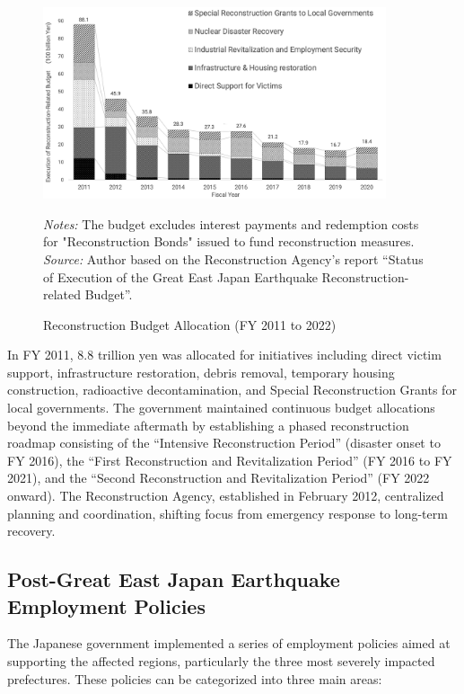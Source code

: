 \documentclass[a4paper,12pt]{article}
\begin{document}
\begin{figure}[htbp]
    \centering
    \includegraphics[width=0.9\textwidth]{Reconstruction-Related Budget.jpeg}
    \footnotesize
    \begin{minipage}{0.9\textwidth}
        \textit{Notes:} The budget excludes interest payments and redemption costs for "Reconstruction Bonds" issued to fund reconstruction measures.\\
        \textit{Source:} Author based on the Reconstruction Agency's report ``Status of Execution of the Great East Japan Earthquake Reconstruction-related Budget''.
    \end{minipage}
    \caption{Reconstruction Budget Allocation (FY 2011 to 2022)}
    \label{fig:Budget}
\end{figure}

In FY 2011, 8.8 trillion yen was allocated for initiatives including direct victim support, infrastructure restoration, debris removal, temporary housing construction, radioactive decontamination, and Special Reconstruction Grants for local governments. The government maintained continuous budget allocations beyond the immediate aftermath by establishing a phased reconstruction roadmap consisting of the ``Intensive Reconstruction Period'' (disaster onset to FY 2016), the ``First Reconstruction and Revitalization Period'' (FY 2016 to FY 2021), and the ``Second Reconstruction and Revitalization Period'' (FY 2022 onward). The Reconstruction Agency, established in February 2012, centralized planning and coordination, shifting focus from emergency response to long-term recovery.

\subsection{Post-Great East Japan Earthquake Employment Policies}

The Japanese government implemented a series of employment policies aimed at supporting the affected regions, particularly the three most severely impacted prefectures. These policies can be categorized into three main areas:
\end{document}
